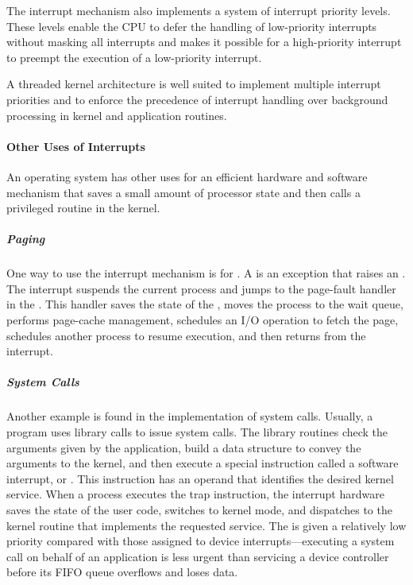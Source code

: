 The interrupt mechanism also implements a system of interrupt priority levels.
These levels enable the CPU to defer the handling of low-priority interrupts without masking all interrupts and makes it possible for a high-priority interrupt to preempt the execution of a low-priority interrupt.

A threaded kernel architecture is well suited to implement multiple interrupt priorities and to enforce the precedence of interrupt handling over background processing in kernel and application routines.

\paragraph{Other Uses of Interrupts}\label{par:Other_Interrupt_Uses}
An operating system has other uses for an efficient hardware and software mechanism that saves a small amount of processor state and then calls a privileged routine in the kernel.

\subparagraph{Paging}\label{subpar:Paging_Interrupts}
One way to use the interrupt mechanism is for  .
A  is an exception that raises an .
The interrupt suspends the current process and jumps to the page-fault handler in the .
This handler saves the state of the , moves the process to the wait queue, performs page-cache management, schedules an I/O operation to fetch the page, schedules another process to resume execution, and then returns from the interrupt.

\subparagraph{System Calls}\label{subpar:System_Call_Interrupts}
Another example is found in the implementation of system calls.
Usually, a program uses library calls to issue system calls.
The library routines check the arguments given by the application, build a data structure to convey the arguments to the kernel, and then execute a special instruction called a software interrupt, or .
This instruction has an operand that identifies the desired kernel service.
When a process executes the trap instruction, the interrupt hardware saves the state of the user code, switches to kernel mode, and dispatches to the kernel routine that implements the requested service.
The  is given a relatively low  priority compared with those assigned to device interrupts—executing a system call on behalf of an application is less urgent than servicing a device controller before its FIFO queue overflows and loses data.

